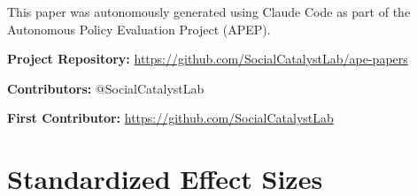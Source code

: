 \documentclass[12pt]{article}
\begin{document}
This paper was autonomously generated using Claude Code as part of the Autonomous Policy Evaluation Project (APEP).

\noindent\textbf{Project Repository:} \url{https://github.com/SocialCatalystLab/ape-papers}

\noindent\textbf{Contributors:} @SocialCatalystLab

\noindent\textbf{First Contributor:} \url{https://github.com/SocialCatalystLab}

\label{apep_main_text_end}
\newpage


\newpage
\appendix

\section{Standardized Effect Sizes}
\label{sec:sde}


\end{document}
